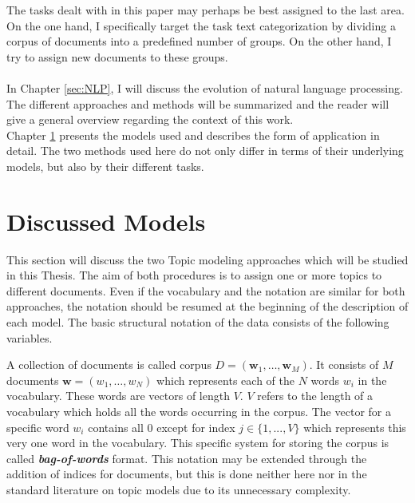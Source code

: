 \documentclass[11pt,a4paper]{article}
\begin{document}
The tasks dealt with in this paper may perhaps be best assigned to the last area. On the one hand, I specifically target the task text categorization by dividing a corpus of documents into a predefined number of groups. On the other hand, I try to assign new documents to these groups.\\
\ \\
In Chapter \ref{sec:NLP}, I will discuss the evolution of natural language processing. The different approaches and methods will be summarized and the reader will give a general overview regarding the context of this work.\\
Chapter \ref{sec:Models} presents the models used and describes the form of application in detail. The two methods used here do not only differ in terms of their underlying models, but also by their different tasks.












\section{Discussed Models} \label{sec:Models}

This section will discuss the two Topic modeling approaches which will be studied in this Thesis. The aim of both procedures is to assign one or more topics to different documents. Even if the vocabulary and the notation are similar for both approaches, the notation should be resumed at the beginning of the description of each model. The basic structural notation of the data consists of the following variables.

A collection of documents is called corpus $D=(\textbf{w}_1,\dots , \textbf{w}_M)$. It consists of $M$ documents $\textbf{w}=(w_1,\dots, w_N)$ which represents each of the $N$ words $w_i$ in the vocabulary. These words are vectors of length $V$. $V$ refers to the length of a vocabulary which holds all the words occurring in the corpus. The vector for a specific word $w_i$ contains all 0 except for index $j\in\{1,...,V\}$ which represents this very one word in the vocabulary. This specific system for storing the corpus is called \textbf{\textit{bag-of-words}} format.
This notation may be extended through the addition of indices for documents, but this is done neither here nor in the standard literature on topic models due to its unnecessary complexity.
\end{document}
